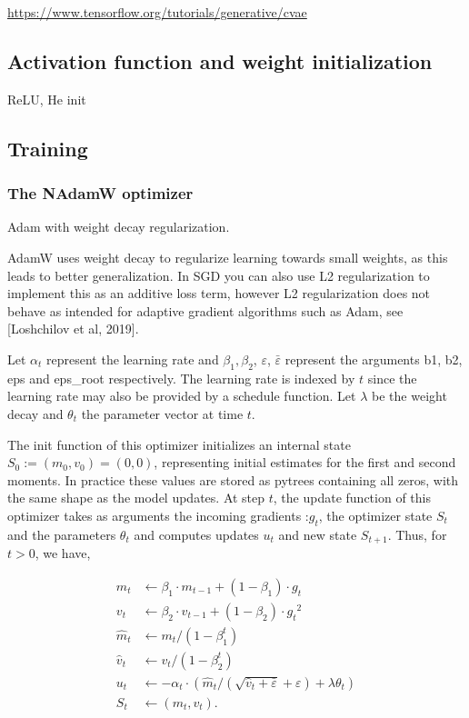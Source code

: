 \url{https://www.tensorflow.org/tutorials/generative/cvae}

\subsection{Activation function and weight initialization}

ReLU, He init

\subsection{Training}

\subsubsection{The NAdamW optimizer}


Adam with weight decay regularization.

AdamW uses weight decay to regularize learning towards small weights, as this leads to better generalization. In SGD you can also use L2 regularization to implement this as an additive loss term, however L2 regularization does not behave as intended for adaptive gradient algorithms such as Adam, see [Loshchilov et al, 2019].

Let $\alpha_t$ represent the learning rate and $\beta_1, \beta_2$,
$\varepsilon$, $\bar{\varepsilon}$  represent the arguments
b1, b2, eps and eps\_root respectively. The learning rate is
indexed by $t$ since the learning rate may also be provided by a
schedule function. Let $\lambda$ be the weight decay and 
$\theta_t$ the parameter vector at time $t$.

The init function of this optimizer initializes an internal state
$S_0 := (m_0, v_0) = (0, 0)$, representing initial estimates for the
first and second moments. In practice these values are stored as pytrees containing all zeros, with the same shape as the model updates.
At step $t$, the update function of this optimizer takes as
arguments the incoming gradients :$g_t$, the optimizer state $S_t$ 
and the parameters $\theta_t$ and computes updates $u_t$ and 
new state $S_{t+1}$. Thus, for $t > 0$, we have,

\begin{align*}
  m_t &\leftarrow \beta_1 \cdot m_{t-1} + (1-\beta_1) \cdot g_t \\
  v_t &\leftarrow \beta_2 \cdot v_{t-1} + (1-\beta_2) \cdot {g_t}^2 \\
  \hat{m}_t &\leftarrow m_t / {(1-\beta_1^t)} \\
  \hat{v}_t &\leftarrow v_t / {(1-\beta_2^t)} \\
  u_t &\leftarrow -\alpha_t \cdot \left( \hat{m}_t / \left({\sqrt{\hat{v}_t 
  + \bar{\varepsilon}} + \varepsilon} \right) + \lambda \theta_{t} \right)\\
  S_t &\leftarrow (m_t, v_t).
\end{align*}

